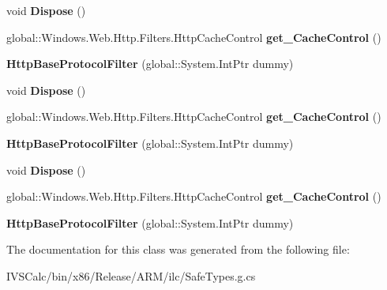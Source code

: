 \begin{DoxyCompactItemize}
void {\bfseries Dispose} ()
\item 
\mbox{\label{class_windows_1_1_web_1_1_http_1_1_filters_1_1_http_base_protocol_filter_a32f94ba5ce4073e498dd59213d098acb}} 
global\+::\+Windows.\+Web.\+Http.\+Filters.\+Http\+Cache\+Control {\bfseries get\+\_\+\+Cache\+Control} ()
\item 
\mbox{\label{class_windows_1_1_web_1_1_http_1_1_filters_1_1_http_base_protocol_filter_a69e9922da152c52a3c5422fccb6f8a7a}} 
{\bfseries Http\+Base\+Protocol\+Filter} (global\+::\+System.\+Int\+Ptr dummy)
\item 
\mbox{\label{class_windows_1_1_web_1_1_http_1_1_filters_1_1_http_base_protocol_filter_a9edd38f75748212aab2c674e5d289759}} 
void {\bfseries Dispose} ()
\item 
\mbox{\label{class_windows_1_1_web_1_1_http_1_1_filters_1_1_http_base_protocol_filter_a32f94ba5ce4073e498dd59213d098acb}} 
global\+::\+Windows.\+Web.\+Http.\+Filters.\+Http\+Cache\+Control {\bfseries get\+\_\+\+Cache\+Control} ()
\item 
\mbox{\label{class_windows_1_1_web_1_1_http_1_1_filters_1_1_http_base_protocol_filter_a69e9922da152c52a3c5422fccb6f8a7a}} 
{\bfseries Http\+Base\+Protocol\+Filter} (global\+::\+System.\+Int\+Ptr dummy)
\item 
\mbox{\label{class_windows_1_1_web_1_1_http_1_1_filters_1_1_http_base_protocol_filter_a9edd38f75748212aab2c674e5d289759}} 
void {\bfseries Dispose} ()
\item 
\mbox{\label{class_windows_1_1_web_1_1_http_1_1_filters_1_1_http_base_protocol_filter_a32f94ba5ce4073e498dd59213d098acb}} 
global\+::\+Windows.\+Web.\+Http.\+Filters.\+Http\+Cache\+Control {\bfseries get\+\_\+\+Cache\+Control} ()
\item 
\mbox{\label{class_windows_1_1_web_1_1_http_1_1_filters_1_1_http_base_protocol_filter_a69e9922da152c52a3c5422fccb6f8a7a}} 
{\bfseries Http\+Base\+Protocol\+Filter} (global\+::\+System.\+Int\+Ptr dummy)
\end{DoxyCompactItemize}


The documentation for this class was generated from the following file\+:\begin{DoxyCompactItemize}
\item 
I\+V\+S\+Calc/bin/x86/\+Release/\+A\+R\+M/ilc/Safe\+Types.\+g.\+cs\end{DoxyCompactItemize}
